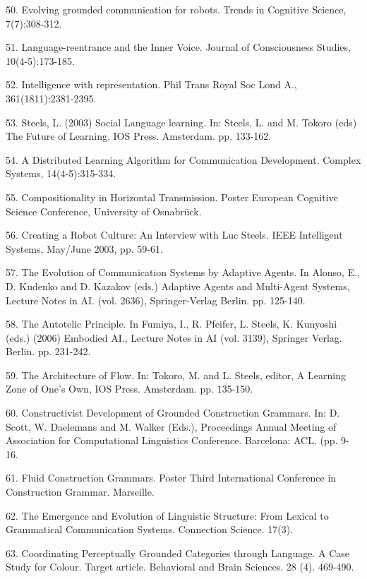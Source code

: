 50. \citet{steels:03b} Evolving grounded communication for robots. Trends in Cognitive Science, 7(7):308-312. 

51. \citet{Steels:03c} Language-reentrance and the Inner Voice. Journal of Consciousness Studies, 10(4-5):173-185. 

52. \citet{Steels:03d} Intelligence with representation. Phil Trans Royal Soc Lond A., 361(1811):2381-2395.

53. \citet{Steels:03e} Steels, L. (2003) Social Language learning. In: Steels, L. and M. Tokoro (eds) The Future of Learning. 
IOS Press. Amsterdam. pp. 133-162. 

54. \citet{dejong:03f} A Distributed Learning Algorithm for Communication Development. 
Complex Systems, 14(4-5):315-334. 

55. \citet{Neubauer:03g}  Compositionality in Horizontal Transmission.  Poster European Cognitive Science Conference, 
University of Osnabrück. 

56. \citet{Manuel:03h} Creating a Robot Culture: An Interview with Luc Steels. IEEE Intelligent Systems, May/June 2003, pp. 59-61. 

57. \citet{steels:04a} The Evolution of Communication Systems by Adaptive Agents. In Alonso, E., D. Kudenko and D. Kazakov (eds.) Adaptive Agents and Multi-Agent Systems, Lecture Notes in AI. (vol. 2636), Springer-Verlag Berlin. pp. 125-140. 

58. \citet{Steels:04b} The Autotelic Principle. In Fumiya, I., R. Pfeifer, L. Steels, K. Kunyoshi (eds.) (2006) Embodied AI., Lecture Notes in AI (vol. 3139), Springer Verlag. Berlin. pp. 231-242. 

59. \citet{Steels:04c} The Architecture of Flow. In: Tokoro, M. and L. Steels, editor, A Learning Zone of One's Own, IOS Press. Amsterdam. 
pp. 135-150.

60. \citet{Steels:04d} Constructivist Development of Grounded Construction Grammars. In: D. Scott, W. Daelemans and M. Walker (Eds.), 
Proceedings Annual Meeting of Association for Computational Linguistics Conference. Barcelona: ACL. (pp. 9-16. 

61. \citet{Steels:04e} Fluid Construction Grammars. Poster Third International Conference in Construction Grammar. Marseille.  

62. \citet{Steels:05a} The Emergence and Evolution of Linguistic Structure: From Lexical to Grammatical Communication Systems. Connection Science. 17(3). 

63. \citet{Steels:05b} Coordinating Perceptually Grounded Categories through Language. A Case Study for Colour. Target article. Behavioral and Brain Sciences. 28 (4). 469-490. 

